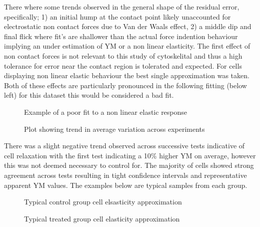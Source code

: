 \documentclass[
  paper=a4,
  ,captions=tableheading
]{scrartcl}
\makeatletter
\newcommand*\pandocbounded[1]{%
  \sbox\pandoc@box{#1}%
  \Gscale@div\@tempa{\textheight}{\dimexpr\ht\pandoc@box+\dp\pandoc@box\relax}%
  \Gscale@div\@tempb{\linewidth}{\wd\pandoc@box}%
  \ifdim\@tempb\p@<\@tempa\p@\let\@tempa\@tempb\fi%
  \ifdim\@tempa\p@<\p@\scalebox{\@tempa}{\usebox\pandoc@box}%
  \else\usebox{\pandoc@box}%
  \fi%
}
\makeatother
\begin{document}
There where some trends observed in the general shape of the residual
error, specifically; 1) an initial hump at the contact point likely
unaccounted for electrostatic non contact forces due to Van der Waals
effect, 2) a middle dip and final flick where fit's are shallower than
the actual force indention behaviour implying an under estimation of YM
or a non linear elasticity. The first effect of non contact forces is
not relevant to this study of cytoskelital and thus a high tolerance for
error near the contact region is tolerated and expected. For cells
displaying non linear elastic behaviour the best single approximation
was taken. Both of these effects are particularly pronounced in the
following fitting (below left) for this dataset this would be considered
a bad fit.

\noindent
\begin{minipage}[t]{0.48\textwidth}
\begin{figure}
\centering
\pandocbounded{}
\caption{Example of a poor fit to a non linear elastic response}
\end{figure}
\end{minipage}
\hfill
\begin{minipage}[t]{0.48\textwidth}
\begin{figure}
\centering
\pandocbounded{}
\caption{Plot showing trend in average variation across experiments}
\end{figure}
\end{minipage}

There was a slight negative trend observed across successive tests
indicative of cell relaxation with the first test indicating a 10\%
higher YM on average, however this was not deemed necessary to control
for. The majority of cells showed strong agreement across tests
resulting in tight confidence intervals and representative apparent YM
values. The examples below are typical samples from each group.

\noindent
\begin{minipage}[t]{0.48\textwidth}
\begin{figure}
\centering
\pandocbounded{}
\caption{Typical control group cell elsasticity approximation}
\end{figure}
\end{minipage}
\hfill
\begin{minipage}[t]{0.48\textwidth}
\begin{figure}
\centering
\pandocbounded{}
\caption{Typical treated group cell elasticity approximation}
\end{figure}
\end{minipage}
\end{document}
